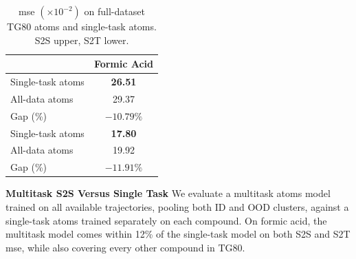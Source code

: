 \newpage

\begin{table}
    \centering
    \caption{\gls{mse} \((\times10^{-2})\) on full-dataset TG80 \gls{atoms} and single-task \gls{atoms}. S2S upper, S2T lower.}
    \begin{tabular}{lc}
        \toprule
        & Formic Acid \\
        \midrule
        Single-task \gls{atoms} & \textbf{26.51} \\
        All-data \gls{atoms} & 29.37 \\
        \midrule
        \rowcolor{gray!20} Gap (\%) & \(-10.79\%\) \\
        \midrule
        Single-task \gls{atoms} & \textbf{17.80} \\
        All-data \gls{atoms} & 19.92 \\
        \midrule
        \rowcolor{gray!20} Gap (\%) & \(-11.91\%\) \\
        \bottomrule
    \end{tabular}
    \label{tab:placeholder}
    \vspace{-0.5\baselineskip}
\end{table}
\textbf{Multitask S2S Versus Single Task} We evaluate a multitask \gls{atoms} model trained on all available trajectories, pooling both ID and OOD clusters, against a single-task \gls{atoms} trained separately on each compound. On formic acid, the multitask model comes within 12\% of the single-task model on both S2S and S2T \gls{mse}, while also covering every other compound in TG80.



